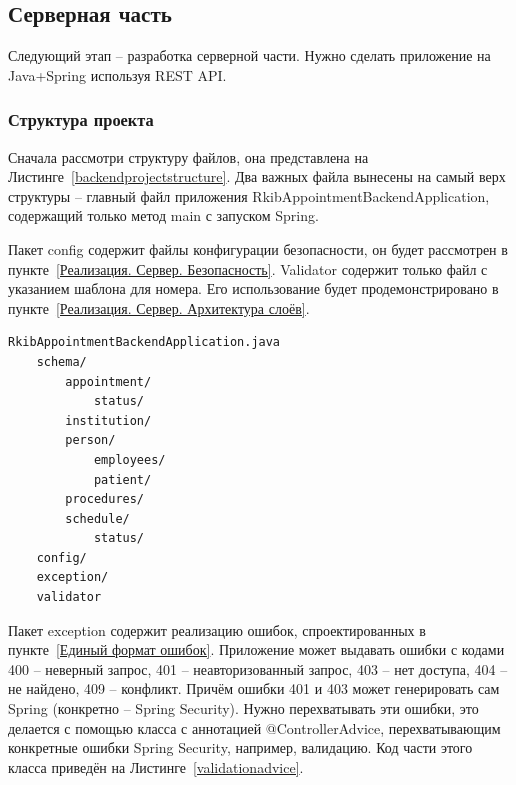 \documentclass[a4paper,article]{article}
\begin{document}
    \subsection{Серверная часть}\label{Реализация. Серверная часть}

    Следующий этап -- разработка серверной части. Нужно сделать приложение на Java+Spring используя REST API.

    \subsubsection{Структура проекта}

    Сначала рассмотри структуру файлов, она представлена на Листинге~\ref{backendprojectstructure}. Два важных файла вынесены на самый верх структуры -- главный файл приложения RkibAppointmentBackendApplication, содержащий только метод main с запуском Spring.
    
    Пакет config содержит файлы конфигурации безопасности, он будет рассмотрен в пункте~\ref{Реализация. Сервер. Безопасность}. Validator содержит только файл с указанием шаблона для номера. Его использование будет продемонстрировано в пункте~\ref{Реализация. Сервер. Архитектура слоёв}.

    \begin{lstlisting}[label=backendprojectstructure,caption=Структура серверного приложения]
    RkibAppointmentBackendApplication.java
    schema/
        appointment/
            status/
        institution/
        person/
            employees/
            patient/
        procedures/
        schedule/
            status/
    config/
    exception/
    validator
    \end{lstlisting}
    
    Пакет exception содержит реализацию ошибок, спроектированных в пункте~\ref{Единый формат ошибок}. Приложение может выдавать ошибки с кодами 400 -- неверный запрос, 401 -- неавторизованный запрос, 403 -- нет доступа, 404 -- не найдено, 409 -- конфликт. Причём ошибки 401 и 403 может генерировать сам Spring (конкретно -- Spring Security). Нужно перехватывать эти ошибки, это делается с помощью класса с аннотацией @ControllerAdvice, перехватывающим конкретные ошибки Spring Security, например, валидацию. Код части этого класса приведён на Листинге~\ref{validationadvice}.
    
\end{document}
